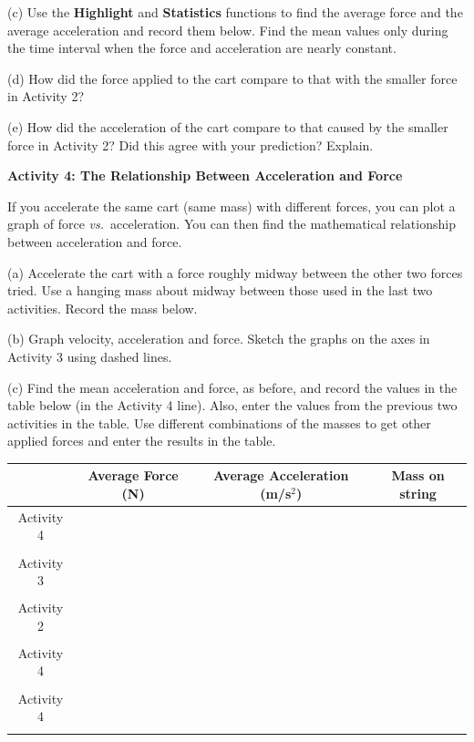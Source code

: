 (c) Use the \textbf{Highlight} and  \textbf{Statistics} functions to find the 
average force and the average acceleration
and record them below. Find the mean values only during the time interval when
the force and acceleration are nearly constant.
\answerspace{15mm}

(d) How did the force applied to the cart compare to that with the smaller force
in Activity 2?
\answerspace{15mm}

(e) How did the acceleration of the cart compare to that caused by the smaller
force in Activity 2? Did this agree with your prediction? Explain.
\answerspace{15mm}

\pagebreak[2]
\textbf{Activity 4: The Relationship Between Acceleration and Force }

If you accelerate the same cart (same mass) with different forces, you can 
plot a graph of force \textit{vs.}~acceleration.
You can then find the mathematical relationship between acceleration and force. 

(a) Accelerate the cart with a force roughly midway between the other two forces
tried. Use a hanging mass about midway between those used in the last two activities.
Record the mass below.
\answerspace{10mm}

(b) Graph velocity, acceleration and force. Sketch the graphs on the axes in
Activity 3 using dashed lines.

(c) Find the mean acceleration and force, as before, and record the values in
the table below (in the Activity 4 line). Also, enter the values from the previous 
two activities in the table.
Use different combinations of the
masses to get other applied forces and enter the results in the table. 

\vspace{0.3cm}
{\centering \begin{tabular}{|c|c|c|c|}
\hline 
&
Average Force (N)&
Average Acceleration (m/s\( ^{2} \)) &
Mass on string\\
\hline 
Activity 4&
&
&
\\
&
&
&
\\
\hline 
Activity 3&
&
&
\\
&
&
&
\\
\hline 
Activity 2&
&
&
\\
&
&
&
\\
\hline 
Activity 4&
&
&
\\
&
&
&
\\
\hline 
Activity 4&
&
&
\\
&
&
&
\\
\hline 
\end{tabular}\par}
\vspace{0.3cm}

